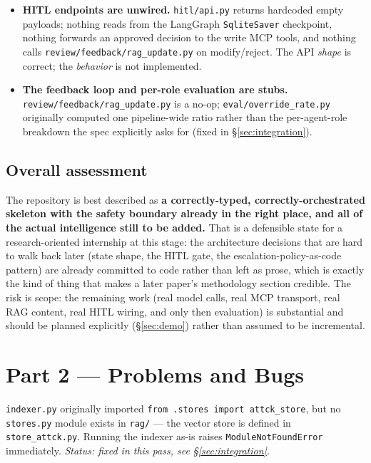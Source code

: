 \documentclass[11pt]{article}
\newenvironment{bugbox}[1]{%
  \begin{tcolorbox}[colback=bugred!5,colframe=bugred!70!black,title=\textbf{#1},fonttitle=\bfseries,boxrule=0.6pt]
}{\end{tcolorbox}}
\begin{document}
\begin{itemize}
  \item \textbf{HITL endpoints are unwired.} \texttt{hitl/api.py} returns hardcoded empty payloads; nothing reads from the LangGraph \texttt{SqliteSaver} checkpoint, nothing forwards an approved decision to the write MCP tools, and nothing calls \texttt{review/feedback/rag\_update.py} on modify/reject. The API \emph{shape} is correct; the \emph{behavior} is not implemented.
  \item \textbf{The feedback loop and per-role evaluation are stubs.} \texttt{review/feedback/rag\_update.py} is a no-op; \texttt{eval/override\_rate.py} originally computed one pipeline-wide ratio rather than the per-agent-role breakdown the spec explicitly asks for (fixed in \S\ref{sec:integration}).
\end{itemize}

\subsection{Overall assessment}

The repository is best described as \textbf{a correctly-typed, correctly-orchestrated skeleton with the safety boundary already in the right place, and all of the actual intelligence still to be added.} That is a defensible state for a research-oriented internship at this stage: the architecture decisions that are hard to walk back later (state shape, the HITL gate, the escalation-policy-as-code pattern) are already committed to code rather than left as prose, which is exactly the kind of thing that makes a later paper's methodology section credible. The risk is scope: the remaining work (real model calls, real MCP transport, real RAG content, real HITL wiring, and only then evaluation) is substantial and should be planned explicitly (\S\ref{sec:demo}) rather than assumed to be incremental.

\section{Part 2 --- Problems and Bugs}
\label{sec:bugs}

\begin{bugbox}{Bug 1 --- Broken import in \texttt{rag/indexer.py}}
\texttt{indexer.py} originally imported \texttt{from .stores import attck\_store}, but no \texttt{stores.py} module exists in \texttt{rag/} --- the vector store is defined in \texttt{store\_attck.py}. Running the indexer as-is raises \texttt{ModuleNotFoundError} immediately. \textit{Status: fixed in this pass, see \S\ref{sec:integration}.}
\end{bugbox}
\end{document}
